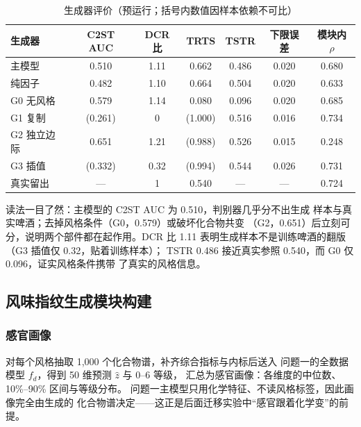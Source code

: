 \documentclass[12pt,a4paper]{article}
\begin{document}
\begin{table}[htbp]
  \centering\small
  \caption{生成器评价（预运行；括号内数值因样本依赖不可比）}
  \label{tab:q3_gen}
  \begin{tabular}{lcccccc}
    \toprule
    生成器 & C2ST AUC & DCR 比 & TRTS & TSTR & 下限误差 & 模块内 $\rho$ \\
    \midrule
    主模型 & 0.510 & 1.11 & 0.662 & 0.486 & 0.020 & 0.680 \\
    纯因子 & 0.482 & 1.10 & 0.664 & 0.504 & 0.020 & 0.633 \\
    G0 无风格 & 0.579 & 1.14 & 0.080 & 0.096 & 0.020 & 0.685 \\
    G1 复制 & (0.261) & 0 & (1.000) & 0.516 & 0.016 & 0.734 \\
    G2 独立边际 & 0.651 & 1.21 & (0.988) & 0.526 & 0.015 & 0.248 \\
    G3 插值 & (0.332) & 0.32 & (0.994) & 0.544 & 0.026 & 0.731 \\
    真实留出 & --- & 1 & 0.540 & --- & --- & 0.724 \\
    \bottomrule
  \end{tabular}
\end{table}

读法一目了然：主模型的 C2ST AUC 为 0.510，判别器几乎分不出生成
样本与真实啤酒；去掉风格条件（G0，0.579）或破坏化合物共变
（G2，0.651）后立刻可分，说明两个部件都在起作用。DCR 比 1.11
表明生成样本不是训练啤酒的翻版（G3 插值仅 0.32，贴着训练样本）；
TSTR 0.486 接近真实参照 0.540，而 G0 仅 0.096，证实风格条件携带
了真实的风格信息。


\subsection{风味指纹生成模块构建}

\subsubsection{感官画像}

对每个风格抽取 1{,}000 个化合物谱，补齐综合指标与内标后送入
问题一的全数据模型 $f_d$，得到 50 维预测 $\hat z$ 与 0--6 等级，
汇总为感官画像：各维度的中位数、10\%--90\% 区间与等级分布。
问题一主模型只用化学特征、不读风格标签，因此画像完全由生成的
化合物谱决定——这正是后面迁移实验中``感官跟着化学变''的前提。
\end{document}

